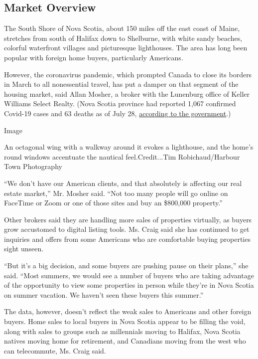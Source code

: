\hypertarget{market-overview}{%
\subsection{Market Overview}\label{market-overview}}

The South Shore of Nova Scotia, about 150 miles off the east coast of
Maine, stretches from south of Halifax down to Shelburne, with white
sandy beaches, colorful waterfront villages and picturesque lighthouses.
The area has long been popular with foreign home buyers, particularly
Americans.

However, the coronavirus pandemic, which prompted Canada to close its
borders in March to all nonessential travel, has put a damper on that
segment of the housing market, said Allan Mosher, a broker with the
Lunenburg office of Keller Williams Select Realty. (Nova Scotia province
had reported 1,067 confirmed Covid-19 cases and 63 deaths as of July 28,
\href{https://novascotia.ca/coronavirus/data/}{according to the
government}.)

Image

An octagonal wing with a walkway around it evokes a lighthouse, and the
home's round windows accentuate the nautical feel.Credit...Tim
Robichaud/Harbour Town Photography

``We don't have our American clients, and that absolutely is affecting
our real estate market,'' Mr. Mosher said. ``Not too many people will go
online on FaceTime or Zoom or one of those sites and buy an \$800,000
property.''

Other brokers said they are handling more sales of properties virtually,
as buyers grow accustomed to digital listing tools. Ms. Craig said she
has continued to get inquiries and offers from some Americans who are
comfortable buying properties sight unseen.

``But it's a big decision, and some buyers are pushing pause on their
plans,'' she said. ``Most summers, we would see a number of buyers who
are taking advantage of the opportunity to view some properties in
person while they're in Nova Scotia on summer vacation. We haven't seen
these buyers this summer.''

The data, however, doesn't reflect the weak sales to Americans and other
foreign buyers. Home sales to local buyers in Nova Scotia appear to be
filling the void, along with sales to groups such as millennials moving
to Halifax, Nova Scotia natives moving home for retirement, and
Canadians moving from the west who can telecommute, Ms. Craig said.

